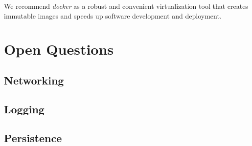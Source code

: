 \documentclass[11pt]{article}
\begin{document}
We recommend \emph{docker} as a robust and convenient virtualization tool that creates immutable images and speeds up software development and deployment.  
\section{Open Questions}
\label{sec-7}
\subsection{Networking}
\label{sec-7-1}
\subsection{Logging}
\label{sec-7-2}
\subsection{Persistence}
\label{sec-7-3}

 
\end{document}
